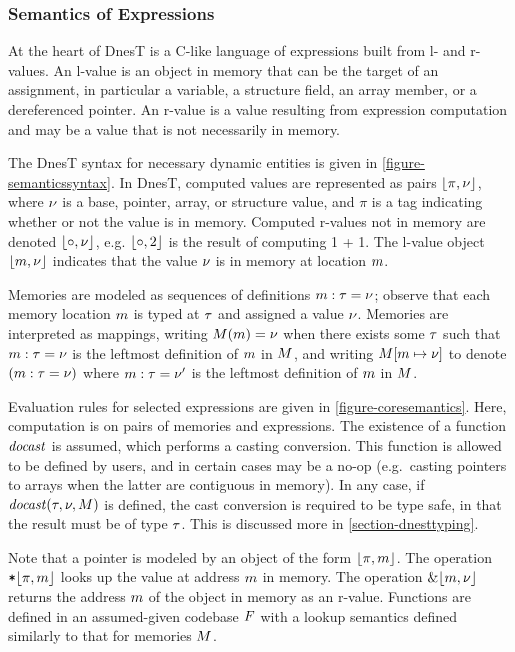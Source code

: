 \semanticssyntaxfig

\subsubsection{Semantics of Expressions}

At the heart of DnesT is a C-like language of expressions built from l- and r-values. An l-value
is an object in memory that can be the target of an assignment, in particular a variable, a
structure field, an array member, or a dereferenced pointer. An r-value is a value resulting
from expression computation and may be a value that is not necessarily in memory.

The DnesT syntax for necessary dynamic entities is given in \autoref{figure-semanticssyntax}. In
DnesT, computed values are represented as pairs $\lfloor \pi,{\nu} \rfloor$, where ${\nu}$ is a base,
pointer, array, or structure value, and $\pi$ is a tag indicating whether or not the value is in
memory. Computed r-values not in memory are denoted $\lfloor \circ,{\nu} \rfloor$, e.g. $\lfloor \circ,2 \rfloor$
is the result of computing 1 + 1. The l-value object $\lfloor m,{\nu} \rfloor$ indicates that the value
${\nu}$ is in memory at location $m$.

Memories are modeled as sequences of definitions $m : \tau = {\nu}$; observe that each memory
location $m$ is typed at $\tau$ and assigned a value ${\nu}$. Memories are interpreted as
mappings, writing $M(m) = {\nu}$ when there exists some $\tau$ such that $m : \tau = {\nu}$
is the leftmost definition of $m$ in $M$, and writing $M[m \mapsto {\nu}]$ to
denote $(m : \tau = {\nu})$ where $m : \tau = {\nu}'$ is the leftmost definition of $m$ in
$M$.

Evaluation rules for selected expressions are given in \autoref{figure-coresemantics}. Here,
computation is on pairs of memories and expressions. The existence of a function
$\mathit{docast}$ is assumed, which performs a casting conversion. This function is allowed to
be defined by users, and in certain cases may be a no-op (e.g.~casting pointers to arrays when
the latter are contiguous in memory). In any case, if $\mathit{docast}(\tau,{\nu},M)$ is defined,
the cast conversion is required to be type safe, in that the result must be of type $\tau$. This
is discussed more in \autoref{section-dnesttyping}.

\coresemanticsfig

Note that a pointer is modeled by an object of the form $\lfloor \pi,m \rfloor$. The operation
$\texttt{*}\lfloor \pi,m \rfloor$ looks up the value at address $m$ in memory. The operation
$\&\lfloor m,{\nu} \rfloor$ returns the address $m$ of the object in memory as an r-value. Functions
are defined in an assumed-given codebase $F$ with a lookup semantics defined similarly to
that for memories $M$.

